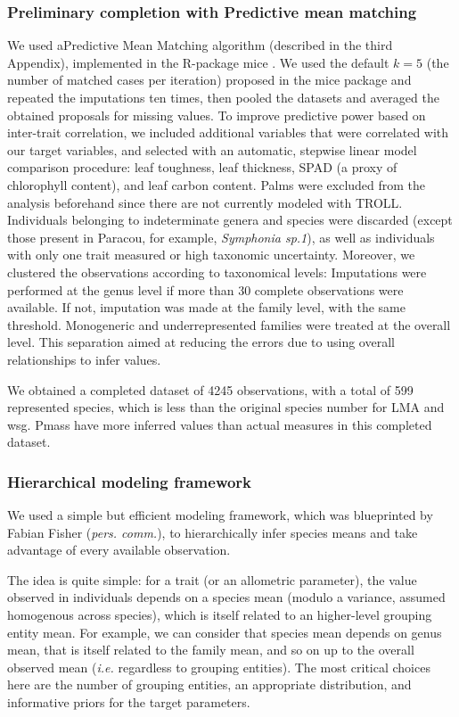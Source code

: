 \documentclass[12pt,]{article}
\theoremstyle{definition}
\theoremstyle{definition}
\theoremstyle{definition}
\theoremstyle{remark}
\begin{document}
\subsubsection{Preliminary completion with Predictive mean
matching}\label{preliminary-completion-with-predictive-mean-matching}

We used aPredictive Mean Matching algorithm (described in the third
Appendix), implemented in the R-package mice \citep{Buuren2011}. We used
the default \(k=5\) (the number of matched cases per iteration) proposed
in the mice package and repeated the imputations ten times, then pooled
the datasets and averaged the obtained proposals for missing values. To
improve predictive power based on inter-trait correlation, we included
additional variables that were correlated with our target variables, and
selected with an automatic, stepwise linear model comparison procedure:
leaf toughness, leaf thickness, SPAD (a proxy of chlorophyll content),
and leaf carbon content. Palms were excluded from the analysis
beforehand since there are not currently modeled with TROLL. Individuals
belonging to indeterminate genera and species were discarded (except
those present in Paracou, for example, \emph{Symphonia sp.1}), as well
as individuals with only one trait measured or high taxonomic
uncertainty. Moreover, we clustered the observations according to
taxonomical levels: Imputations were performed at the genus level if
more than 30 complete observations were available. If not, imputation
was made at the family level, with the same threshold. Monogeneric and
underrepresented families were treated at the overall level. This
separation aimed at reducing the errors due to using overall
relationships to infer values.

We obtained a completed dataset of 4245 observations, with a total of
599 represented species, which is less than the original species number
for LMA and wsg. Pmass have more inferred values than actual measures in
this completed dataset.

\subsubsection{Hierarchical modeling
framework}\label{hierarchical-modeling-framework}

We used a simple but efficient modeling framework, which was blueprinted
by Fabian Fisher (\emph{pers. comm.}), to hierarchically infer species
means and take advantage of every available observation.

The idea is quite simple: for a trait (or an allometric parameter), the
value observed in individuals depends on a species mean (modulo a
variance, assumed homogenous across species), which is itself related to
an higher-level grouping entity mean. For example, we can consider that
species mean depends on genus mean, that is itself related to the family
mean, and so on up to the overall observed mean (\emph{i.e.} regardless
to grouping entities). The most critical choices here are the number of
grouping entities, an appropriate distribution, and informative priors
for the target parameters.
\end{document}
